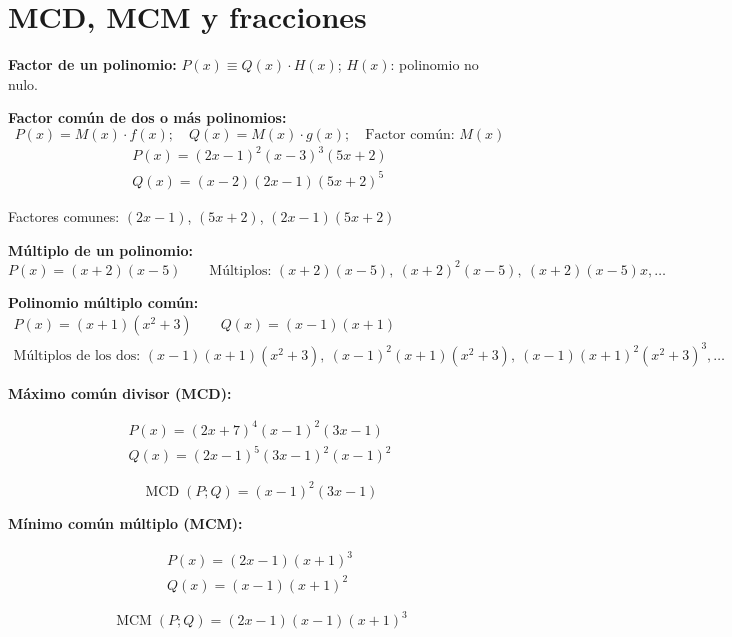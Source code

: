 \documentclass[11pt,a4paper]{article}
\begin{document}
\newpage
\section{MCD, MCM y fracciones}

\textbf{Factor de un polinomio:} \quad $P(x) \equiv Q(x)\cdot H(x)$; \quad $H(x)$: polinomio no nulo.

\textbf{Factor común de dos o más polinomios:}
\[P(x) = M(x)\cdot f(x);\quad Q(x) = M(x)\cdot g(x);\quad \text{Factor común: } M(x)\]
\begin{gather*}
P(x) = (2x - 1)^2(x - 3)^3(5x + 2)\\
Q(x) = (x - 2)(2x - 1)(5x + 2)^5
\end{gather*}
\begin{center}
Factores comunes: $(2x - 1)$, $(5x + 2)$, $(2x - 1)(5x + 2)$
\end{center}

\textbf{Múltiplo de un polinomio:}
\[P(x) = (x + 2)(x - 5) \qquad \text{Múltiplos: } (x+2)(x-5),\ (x+2)^2(x-5),\ (x+2)(x-5)x, \ldots\]

\textbf{Polinomio múltiplo común:}
\begin{gather*}
P(x) = (x + 1)(x^2 + 3) \qquad Q(x) = (x - 1)(x + 1)\\
\text{Múltiplos de los dos: } (x-1)(x+1)(x^2+3),\ (x-1)^2(x+1)(x^2+3),\ (x-1)(x+1)^2(x^2+3)^3, \ldots
\end{gather*}

\textbf{Máximo común divisor (MCD):}

\begin{minipage}{0.485\textwidth}
\begin{gather*}
P(x) = (2x + 7)^4(x - 1)^2(3x - 1)\\
Q(x) = (2x - 1)^5(3x - 1)^2(x - 1)^2
\end{gather*}
\end{minipage}\hfill
\begin{minipage}{0.485\textwidth}
\[\operatorname{MCD}(P;Q) = (x - 1)^2(3x - 1)\]
\end{minipage}

\textbf{Mínimo común múltiplo (MCM):}

\begin{minipage}{0.485\textwidth}
\begin{gather*}
P(x) = (2x - 1)(x + 1)^3\\
Q(x) = (x - 1)(x + 1)^2
\end{gather*}
\end{minipage}\hfill
\begin{minipage}{0.485\textwidth}
\[\operatorname{MCM}(P;Q) = (2x - 1)(x - 1)(x + 1)^3\]
\end{minipage}
\end{document}
